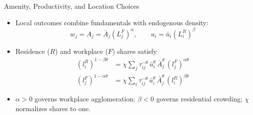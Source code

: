 \documentclass[11pt,aspectratio=169]{beamer}
\begin{document}
\begin{frame}{Amenity, Productivity, and Location Choices}
\begin{itemize}\small
  \item Local outcomes combine fundamentals with endogenous density:
  \vspace{-0.5em}\begin{equation}\label{eq:agglom}
    w_j = A_j = \bar A_j\left(L_j^F\right)^\alpha, \qquad u_i=\bar u_i\left(L_i^R\right)^\beta
  \end{equation}
  \vspace{-0.4em}
  \item Residence ($R$) and workplace ($F$) shares satisfy
  \vspace{-0.2em}
  \begin{align}
  (l_i^R)^{1-\beta\theta} & = \chi \sum_j\tau_{ij}^{-\theta}\,\bar u_i^{\theta}\,\bar A_j^{\theta}\,(l_j^F)^{\alpha\theta} \label{eq:clear1} \\
  (l_j^F)^{1-\alpha\theta} & = \chi \sum_i\tau_{ij}^{-\theta}\,\bar u_i^{\theta}\,\bar A_j^{\theta}\,(l_i^R)^{\beta\theta} \label{eq:clear2}
  \end{align}
  \vspace{-0.7em}
  \item $\alpha>0$ governs workplace agglomeration; $\beta<0$ governs residential crowding; $\chi$ normalizes shares to one.
\end{itemize}
\end{frame}
\end{document}
